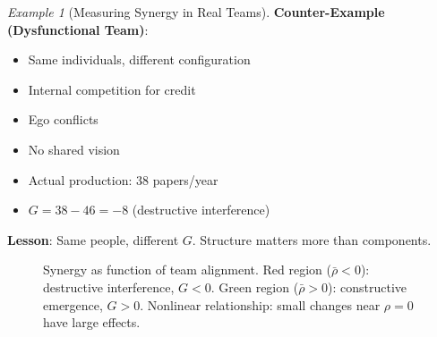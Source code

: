 \documentclass[11pt,a4paper]{article}
\theoremstyle{definition}
\theoremstyle{remark}
\newtheorem{example}{Example}[section]
\begin{document}
\begin{small}
\begin{enumerate}
\begin{example}[Measuring Synergy in Real Teams]
\textbf{Counter-Example (Dysfunctional Team)}:
\begin{itemize}
    \item Same individuals, different configuration
    \item Internal competition for credit
    \item Ego conflicts
    \item No shared vision
    \item Actual production: 38 papers/year
    \item \(G = 38 - 46 = -8\) (destructive interference)
\end{itemize}

\textbf{Lesson}: Same people, different \(G\). Structure matters more than components.
\end{example}

\begin{figure}[H]
\centering
{}
\caption{Synergy as function of team alignment. Red region (\(\bar{\rho} < 0\)): destructive interference, \(G < 0\). Green region (\(\bar{\rho} > 0\)): constructive emergence, \(G > 0\). Nonlinear relationship: small changes near \(\rho = 0\) have large effects.}
\label{fig:synergy_landscape}
\end{figure}


\end{enumerate}
\end{small}
\end{document}

